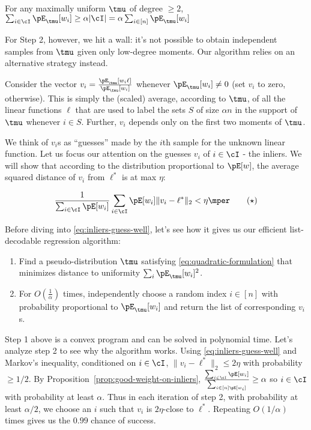 \begin{proposition}
For any maximally uniform $\tmu$ of degree $\geq 2$,  $\sum_{i \in \cI} \pE_{\tmu}[w_i]  \geq \alpha |\cI| = \alpha \sum_{i\in [n]} \pE_{\tmu}[w_i]$\mper\label{prop:good-weight-on-inliers}
\end{proposition} 

For Step 2, however, we hit a wall: it's not possible to obtain independent samples from $\tmu$ given only low-degree moments. Our algorithm relies on an alternative strategy instead. 

Consider the vector $v_i = \frac{\pE_{\tmu}[w_i \ell]}{\pE_{\tmu}[w_i]}$ whenever $\pE_{\tmu}[w_i] \neq 0$ (set $v_i$ to zero, otherwise).  This is simply the (scaled) average, according to $\tmu$, of all the linear functions $\ell$ that are used to label the sets $S$ of size $\alpha n$ in the support of $\tmu$ whenever $i \in S$. Further, $v_i$ depends only on the first two moments of $\tmu$.

We think of $v_i$s as ``guesses''%
made by the $i$th sample for the unknown linear function. 
Let us focus our attention on the guesses $v_i$ of $i \in \cI$ - the inliers. We will show that according to the distribution proportional to $\pE[w]$, the average squared distance of $v_i$ from $\ell^*$ is at max $\eta$:

\begin{equation}
\frac{1}{\sum_{i \in \cI} \pE[w_i]} \sum_{i \in \cI} \pE[w_i] \| v_i - \ell^*\|_2  < \eta \mper \label{eq:inliers-guess-well}\tag{$\star$}
\end{equation}

Before diving into \eqref{eq:inliers-guess-well}, let's see how it gives us our efficient list-decodable regression algorithm:

\begin{enumerate}
	\item Find a pseudo-distribution $\tmu$ satisfying \eqref{eq:quadratic-formulation} that minimizes distance to uniformity $\sum_i \pE_{\tmu}[w_i]^2$.
	\item For $O(\frac{1}{\alpha})$ times, independently choose a random index $i \in [n]$ with probability proportional to $\pE_{\tmu}[w_i]$ and return the list of corresponding $v_i$s. 
\end{enumerate} 

Step 1 above is a convex program and can be solved in polynomial time. Let's analyze step 2 to see why the algorithm works. Using \eqref{eq:inliers-guess-well} and Markov's inequality, conditioned on $i \in \cI$, $\|v_i - \ell^*\|_2 \leq 2 \eta$ with probability $\geq 1/2$. By Proposition~\ref{prop:good-weight-on-inliers}, $\frac{\sum_{i \in \cI} \pE[w_i]}{\sum_{i \in [n] \pE[w_i]}} \geq \alpha$ so $i \in \cI$ with probability at least $\alpha$. Thus in each iteration of step 2, with probability at least $\alpha/2$, we choose an $i$ such that $v_i$ is $2\eta$-close to $\ell^*$. Repeating $O(1/\alpha)$ times gives us the $0.99$ chance of success.


